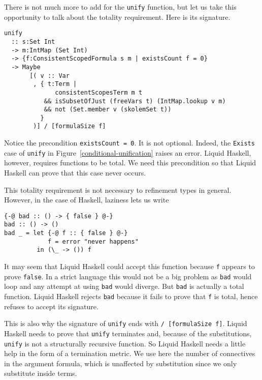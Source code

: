 \documentclass[sigconf]{acmart}
\newcommand{\tc}[1]{{\small\texttt{#1}}}
\begin{document}
There is not much more to add for the \tc{unify} function, but let us take this
opportunity to talk about the totality requirement. Here is its signature.

\begin{verbatim}
unify
  :: s:Set Int
  -> m:IntMap (Set Int)
  -> {f:ConsistentScopedFormula s m | existsCount f = 0}
  -> Maybe
       [( v :: Var
        , { t:Term |
              consistentScopesTerm m t
           && isSubsetOfJust (freeVars t) (IntMap.lookup v m)
           && not (Set.member v (skolemSet t))
          }
        )] / [formulaSize f]
\end{verbatim}

Notice the precondition \tc{existsCount = 0}. It is not optional. Indeed, the
\tc{Exists} case of \tc{unify} in Figure~\ref{conditional-unification} raises an
error. Liquid Haskell, however, requires functions to be total. We need this
precondition so that Liquid Haskell can prove that this case never occurs.

This totality requirement is not necessary to refinement types in general.
However, in the case of Haskell, laziness lets us write
\begin{verbatim}
{-@ bad :: () -> { false } @-}
bad :: () -> ()
bad _ = let {-@ f :: { false } @-}
            f = error "never happens"
         in (\_ -> ()) f
\end{verbatim}
It may seem that Liquid Haskell could accept this function because \tc{f} appears
to prove \tc{false}. In a strict language this would not be a big problem as
\tc{bad} would loop and any attempt at using \tc{bad} would diverge. But \tc{bad} is
actually a total function. Liquid Haskell rejects \tc{bad} because it fails to
prove that \tc{f} is total, hence refuses to accept its signature.

This is also why the signature of \tc{unify} ends with \tc{/ [formulaSize f]}.
Liquid Haskell needs to prove that \tc{unify} terminates and, because of the
substitutions, \tc{unify} is not a structurally recursive function. So Liquid
Haskell needs a little help in the form of a termination metric. We use here
the number of connectives in the argument formula, which is unaffected by
substitution since we only substitute inside terms.

\end{document}
